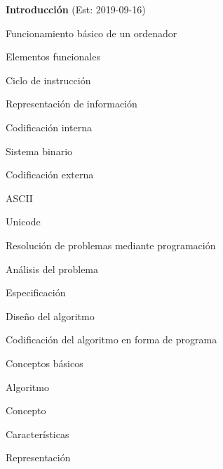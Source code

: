 \begin{longenum}
    \item \textbf{Introducción}  (Est: 2019-09-16)
    \begin{longenum}
        \item Funcionamiento básico de un ordenador
        \begin{longenum}
            \item Elementos funcionales
            \item Ciclo de instrucción
            \item Representación de información
            \begin{longenum}
                \item Codificación interna
                \begin{longenum}
                    \item Sistema binario
                \end{longenum}
                \item Codificación externa
                \begin{longenum}
                    \item ASCII
                    \item Unicode
                \end{longenum}
            \end{longenum}
        \end{longenum}
        \item Resolución de problemas mediante programación
        \begin{longenum}
            \item Análisis del problema
            \item Especificación
            \item Diseño del algoritmo
            \item Codificación del algoritmo en forma de programa
        \end{longenum}
        \item Conceptos básicos
        \begin{longenum}
            \item Algoritmo
            \begin{longenum}
                \item Concepto
                \item Características
                \item Representación
                \begin{longenum}

\end{longenum}
\end{longenum}
\end{longenum}
\end{longenum}
\end{longenum}
